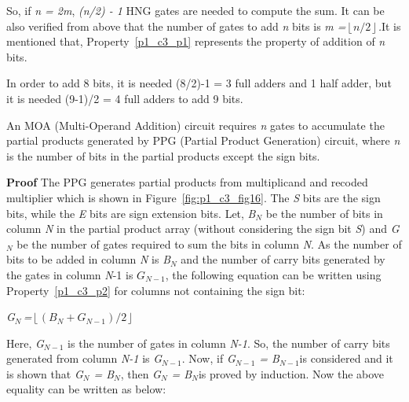So, if \textit{n = 2m}, \textit{(n/2) - 1} HNG gates are needed to compute the sum. It can be also verified from above that the number of gates to add \textit{n} bits is \textit{m =$\left\lfloor n/2\right\rfloor $.}It is mentioned that, Property~\ref{p1_c3_p1} represents the property of addition of \textit{n} bits.

\begin{example}\textnormal{
	 In order to add {8} bits, it is needed {(8/2)-1 = 3} full adders and {1} half adder, but it is needed {(9-1)/2 = 4} full adders to add {9} bits.}
\end{example}

\begin{property}\label{p1_c3_p2}\textnormal{
	An MOA (Multi-Operand Addition) circuit requires \textit{n} gates to accumulate the partial products generated by PPG (Partial Product Generation) circuit, where \textit{n} is the number of bits in the partial products except the sign bits.}
\end{property}

\noindent\textbf{Proof}
	The PPG generates partial products from multiplicand and recoded multiplier which is shown in Figure~\ref{fig:p1_c3_fig16}. The \textit{S} bits are the sign bits, while the \textit{E} bits are sign extension bits. Let, \textit{B${}_{N}$} be the number of bits in column \textit{N} in the partial product array (without considering the sign bit \textit{S}) and \textit{G${}_{N}$} be the number of gates required to sum the bits in column \textit{N}. As the number of bits to be added in column \textit{N} is \textit{B${}_{N}$} and the number of carry bits generated by the gates in column \textit{N}-1 is $G_{N-1}$, the following equation can be written using Property~\ref{p1_c3_p2} for columns not containing the sign bit:

\noindent \begin{center}
	\textit{G${}_{N\ }$=}$\left\lfloor (B_{N} +G_{N-1} )/2\right\rfloor $
\end{center}

\noindent \begin{flushleft}
	
\end{flushleft}

\noindent Here, \textit{G${}_{N-1}$} is the number of gates in column \textit{N-1}. So, the number of carry bits generated from column \textit{N-1} is \textit{G${}_{N-1}$}. Now, if \textit{G${}_{N-1}$ = B${}_{N-1}$}is considered and it is shown that \textit{G${}_{N}$ = B${}_{N}$}, then \textit{G${}_{N}$ = B${}_{N}$}is proved by induction. Now the above equality can be written as below:

